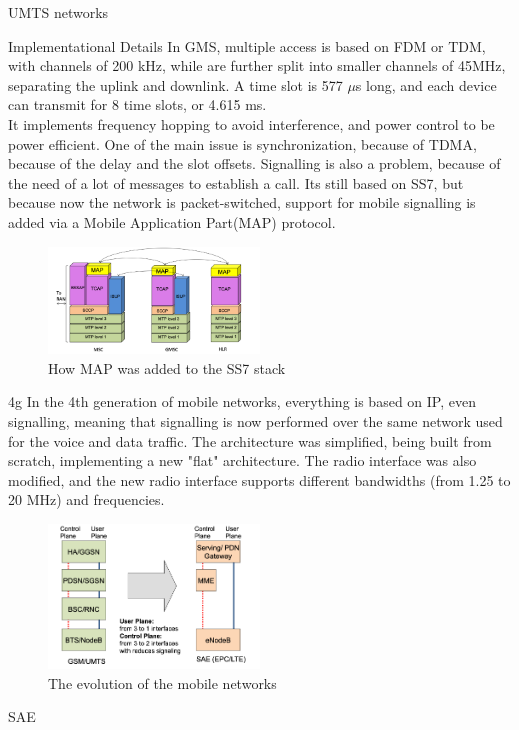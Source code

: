 \begin{section}{UMTS networks}
  \begin{subsection}{Implementational Details}
    In GMS, multiple access is based on FDM or TDM, with channels of 200 kHz, while are further 
    split into smaller channels of 45MHz, separating the uplink and downlink. A time slot is 577
    $\mu$s long, and each device can transmit for 8 time slots, or 4.615 ms.\\
    It implements frequency hopping to avoid interference, and power control to be power efficient.
    One of the main issue is synchronization, because of TDMA, because of the delay and the slot
    offsets. Signalling is also a problem, because of the need of a lot of messages to establish a
    call. Its still based on SS7, but because now the network is packet-switched, support for mobile
    signalling is added via a Mobile Application Part(MAP) protocol.\\
    \begin{figure}[h]
      \centering
      \includegraphics[width=0.5\textwidth]{img/wireless/mobile ss7.png}
      \caption{How MAP was added to the SS7 stack}
      \label{fig:mobile-ss7}
    \end{figure}
  \end{subsection}

\end{section}

\begin{section}{4g}
  In the 4th generation of mobile networks, everything is based on IP, even signalling, meaning that
  signalling is now performed over the same network used for the voice and data traffic. The
  architecture was simplified, being built from scratch, implementing a new "flat" architecture.
  The radio interface was also modified, and the new radio interface supports different bandwidths
  (from 1.25 to 20 MHz) and frequencies.

  \begin{figure}[h]
    \centering
    \includegraphics[width=0.5\textwidth]{img/wireless/4g evolution.png}
    \caption{The evolution of the mobile networks}
  \end{figure}
  \begin{subsection}{SAE}
  \end{subsection}

\end{section}
